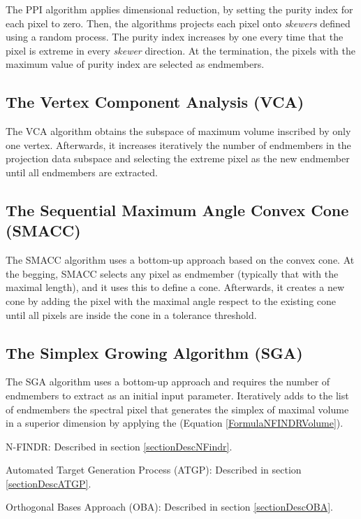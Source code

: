 \documentclass[11pt, oneside]{Thesis} %
\begin{document}
The PPI algorithm applies dimensional reduction, by setting the purity index 
for each pixel to zero. Then, the algorithms projects each pixel onto 
\emph{skewers} defined using a random process. The purity index increases by 
one every time that the pixel is extreme in every \emph{skewer} direction. 
At the termination, the pixels with the maximum value of purity 
index are selected as endmembers.
       
\subsection{The Vertex Component Analysis (VCA) \cite{VCA}} 
The VCA algorithm obtains the subspace of maximum volume inscribed by only 
one vertex. Afterwards, it increases iteratively the number of endmembers in 
the projection data subspace and selecting the extreme pixel as the new endmember 
until all endmembers are extracted.
	
\subsection{The Sequential Maximum Angle Convex Cone (SMACC) \cite{SMACC}} 
The SMACC algorithm uses a bottom-up approach based on the convex cone. 
At the begging, SMACC selects any pixel as endmember (typically that with the 
maximal length), and it uses this to define a cone. Afterwards, it creates a 
new cone by adding the pixel with the maximal angle respect to the existing 
cone until all pixels are inside the cone in a tolerance threshold.

\subsection{The Simplex Growing Algorithm (SGA) \cite{SGA}} 
The SGA algorithm uses a bottom-up approach and requires the number of 
endmembers to extract as an initial input parameter. Iteratively adds to the list 
of endmembers the spectral pixel that generates the simplex of maximal 
volume in a superior dimension by applying the 
(Equation \ref{FormulaNFINDRVolume}).
  
\iffalse  
  \item N-FINDR: Described in section \ref{sectionDescNFindr}.
  
  \item Automated Target Generation Process (ATGP): Described in section 
	\ref{sectionDescATGP}.
  
  \item Orthogonal Bases Approach (OBA): Described in section \ref{sectionDescOBA}.
  
\end{document}
